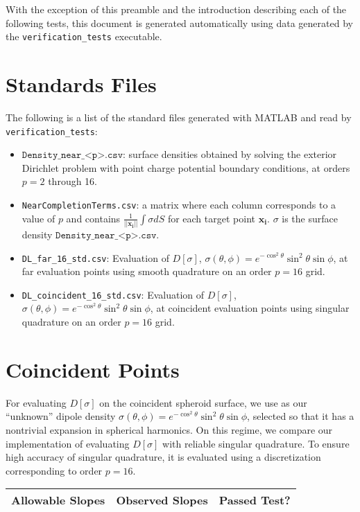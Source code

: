 \documentclass[12pt]{article}
\begin{document}
With the exception of this preamble and the introduction describing each of the following tests, this document is generated automatically using data generated by the \texttt{verification\_tests} executable.

\pagebreak

\section*{Standards Files}
The following is a list of the standard files generated with MATLAB and read by \texttt{verification\_tests}:
\begin{itemize}
    \item $\texttt{Density\_near\_<p>.csv}$: surface densities  obtained by solving the exterior Dirichlet problem with point charge potential boundary conditions, at orders $p=2$ through 16.
    \item \texttt{NearCompletionTerms.csv}: a matrix where each column corresponds to a value of $p$ and contains $\frac{1}{||\mathbf{x_i}||}\int \sigma d S$ for each target point $\mathbf{x_i}$. $\sigma$ is the surface density $\texttt{Density\_near\_<p>.csv}$.
    \item \texttt{DL\_far\_16\_std.csv}: Evaluation of $D[\sigma]$, $\sigma(\theta,\phi)=e^{-\cos^2\theta} \sin^2\theta \sin\phi$, at far evaluation points using smooth quadrature on an order $p=16$ grid.
    \item \texttt{DL\_coincident\_16\_std.csv}: Evaluation of $D[\sigma]$, $\sigma(\theta,\phi)=e^{-\cos^2\theta} \sin^2\theta \sin\phi$, at coincident evaluation points using singular quadrature on an order $p=16$ grid.
\end{itemize}

\pagebreak

\section*{Coincident Points}
For evaluating $D[\sigma]$ on the coincident spheroid surface, we use as our ``unknown'' dipole density $\sigma(\theta,\phi)=e^{-\cos^2\theta} \sin^2\theta \sin\phi$, selected so that it has a nontrivial expansion in spherical harmonics. 
On this regime, we compare our implementation of evaluating $D[\sigma]$ with reliable singular quadrature.
To ensure high accuracy of singular quadrature, it is evaluated using a discretization corresponding to order $p=16$.

\begin{center}
\def\arraystretch{1.5}
\begin{tabular}{|c|c|c|} \hline
    Allowable Slopes & Observed Slopes & Passed Test?\\ \hline
    
\end{tabular}
\end{center}
\end{document}
